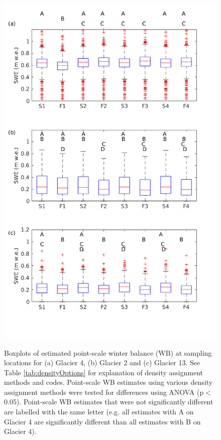 \documentclass{sfuthesis}
\begin{document}
\begin{figure}[H]
	\centering
	\includegraphics[height = 0.8\textheight]{AllSWEopts_boxplot.png}\\
	\caption{Boxplots of estimated point-scale winter balance (WB) at sampling locations for (a) Glacier 4, (b) Glacier 2 and (c) Glacier 13. See Table \ref{tab:densityOptions} for explanation of density assignment methods and codes. Point-scale WB estimates using various density assignment methods were tested for differences using ANOVA (p$<$0.05). Point-scale WB estimates that were not significantly different are labelled with the same letter (e.g. all estimates with A on Glacier 4 are significantly different than all estimates with B on Glacier 4).}
	\label{fig:AllSWEopts_boxplot}
\end{figure}
\end{document}
